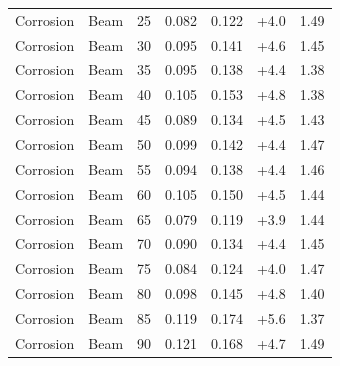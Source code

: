 \begin{longtable}{llrrrrr}
    Corrosion & Beam & 25 & 0.082 & 0.122 & +4.0 & 1.49 \\
    Corrosion & Beam & 30 & 0.095 & 0.141 & +4.6 & 1.45 \\
    Corrosion & Beam & 35 & 0.095 & 0.138 & +4.4 & 1.38 \\
    Corrosion & Beam & 40 & 0.105 & 0.153 & +4.8 & 1.38 \\
    Corrosion & Beam & 45 & 0.089 & 0.134 & +4.5 & 1.43 \\
    Corrosion & Beam & 50 & 0.099 & 0.142 & +4.4 & 1.47 \\
    Corrosion & Beam & 55 & 0.094 & 0.138 & +4.4 & 1.46 \\
    Corrosion & Beam & 60 & 0.105 & 0.150 & +4.5 & 1.44 \\
    Corrosion & Beam & 65 & 0.079 & 0.119 & +3.9 & 1.44 \\
    Corrosion & Beam & 70 & 0.090 & 0.134 & +4.4 & 1.45 \\
    Corrosion & Beam & 75 & 0.084 & 0.124 & +4.0 & 1.47 \\
    Corrosion & Beam & 80 & 0.098 & 0.145 & +4.8 & 1.40 \\
    Corrosion & Beam & 85 & 0.119 & 0.174 & +5.6 & 1.37 \\
    Corrosion & Beam & 90 & 0.121 & 0.168 & +4.7 & 1.49 \\
\end{longtable}